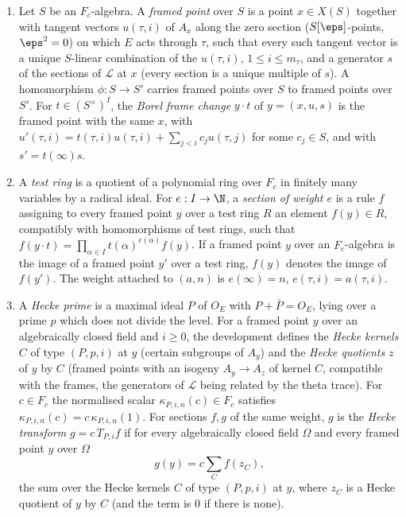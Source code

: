 \begin{definition}\label{pf:liftinj:frdef}
\begin{enumerate}[label=(\alph*)]
\item Let $S$ be an $F_c$-algebra. A \emph{framed point} over $S$ is a point $x\in X(S)$ together with tangent vectors $u(\tau,i)$ of $A_x$ along the
zero section ($S[\eps]$-points, $\eps^2=0$) on which $E$ acts through $\tau$, such that every such tangent vector is a unique $S$-linear combination
of the $u(\tau,i)$, $1\le i\le m_\tau$, and a generator $s$ of the sections of $\mathcal L$ at $x$ (every section is a unique multiple of $s$). A
homomorphism $\phi:S\to S'$ carries framed points over $S$ to framed points over $S'$. For $t\in(S^\times)^I$, the \emph{Borel frame change} $y\cdot t$ of
$y=(x,u,s)$ is the framed point with the same $x$, with $u'(\tau,i)=t(\tau,i)u(\tau,i)+\sum_{j<i}c_ju(\tau,j)$ for some $c_j\in S$, and with
$s'=t(\infty)s$.
\item A \emph{test ring} is a quotient of a polynomial ring over $F_c$ in finitely many variables by a radical ideal. For $e:I\to\N$, a \emph{section of
weight $e$} is a rule $f$ assigning to every framed point $y$ over a test ring $R$ an element $f(y)\in R$, compatibly with homomorphisms of test
rings, such that $f(y\cdot t)=\prod_{\alpha\in I}t(\alpha)^{e(\alpha)}f(y)$. If a framed point $y$ over an $F_c$-algebra is the image of a framed
point $y'$ over a test ring, $f(y)$ denotes the image of $f(y')$. The weight attached to $(a,n)$ is $e(\infty)=n$, $e(\tau,i)=a(\tau,i)$.
\item A \emph{Hecke prime} is a maximal ideal $P$ of $O_E$ with $P+\bar P=O_E$, lying over a prime $p$ which does not divide the level. For a framed
point $y$ over an algebraically closed field and $i\ge0$, the development defines the \emph{Hecke kernels} $C$ of type $(P,p,i)$ at $y$ (certain
subgroups of $A_y$) and the \emph{Hecke quotients} $z$ of $y$ by $C$ (framed points with an isogeny $A_y\to A_z$ of kernel $C$, compatible with the
frames, the generators of $\mathcal L$ being related by the theta trace). For $c\in F_c$ the normalised scalar $\kappa_{P,i,n}(c)\in F_c$ satisfies
$\kappa_{P,i,n}(c)=c\,\kappa_{P,i,n}(1)$. For sections $f,g$ of the same weight, $g$ is the \emph{Hecke transform} $g=c\,T_{P,i}f$ if for every
algebraically closed field $\Omega$ and every framed point $y$ over $\Omega$
\[
g(y)=c\sum_Cf(z_C),
\]
the sum over the Hecke kernels $C$ of type $(P,p,i)$ at $y$, where $z_C$ is a Hecke quotient of $y$ by $C$ (and the term is $0$ if there is none).

\end{enumerate}
\end{definition}
